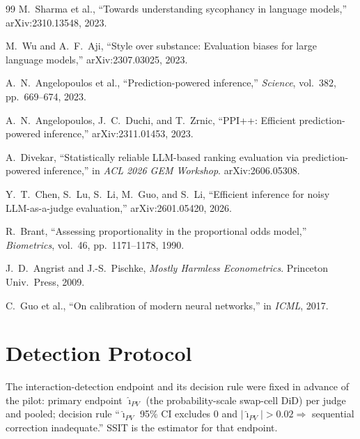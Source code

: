 \documentclass{article}
\begin{document}
\begin{thebibliography}{99}
M.~Sharma et al., ``Towards understanding sycophancy in language
models,'' arXiv:2310.13548, 2023.

M.~Wu and A.~F.~Aji, ``Style over substance: Evaluation biases for
large language models,'' arXiv:2307.03025, 2023.

A.~N.~Angelopoulos et al., ``Prediction-powered inference,''
\emph{Science}, vol.~382, pp.~669--674, 2023.

A.~N.~Angelopoulos, J.~C.~Duchi, and T.~Zrnic, ``PPI++: Efficient
prediction-powered inference,'' arXiv:2311.01453, 2023.

A.~Divekar, ``Statistically reliable LLM-based ranking evaluation
via prediction-powered inference,'' in \emph{ACL 2026 GEM
Workshop}. arXiv:2606.05308.

Y.~T.~Chen, S.~Lu, S.~Li, M.~Guo, and S.~Li, ``Efficient inference
for noisy LLM-as-a-judge evaluation,'' arXiv:2601.05420, 2026.

R.~Brant, ``Assessing proportionality in the proportional odds
model,'' \emph{Biometrics}, vol.~46, pp.~1171--1178, 1990.

J.~D.~Angrist and J.-S.~Pischke, \emph{Mostly Harmless
Econometrics}. Princeton Univ.\ Press, 2009.

C.~Guo et al., ``On calibration of modern neural networks,'' in
\emph{ICML}, 2017.

\end{thebibliography}

\appendix

\section{Detection Protocol}
\label{app:prereg}
The interaction-detection endpoint and its decision rule were fixed
in advance of the pilot: primary endpoint $\hat\imath_{PV}$ (the
probability-scale swap-cell DiD) per judge and pooled; decision rule
``$\hat\imath_{PV}$ 95\% CI excludes 0 and
$|\hat\imath_{PV}|>0.02\Rightarrow$ sequential correction
inadequate.'' SSIT is the estimator for that endpoint.
\end{document}

